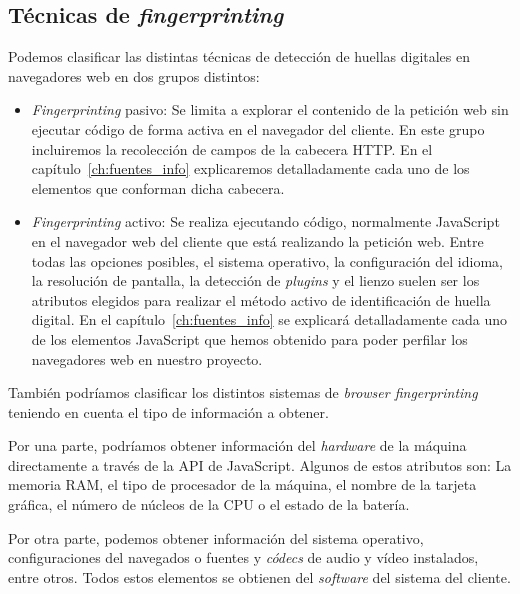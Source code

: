 \subsection{Técnicas de \textit{fingerprinting}}

Podemos clasificar las distintas técnicas de detección de huellas digitales en navegadores web en dos grupos distintos: \par 

\begin{itemize}
	\item \textit{Fingerprinting} pasivo: Se limita a explorar el contenido de la petición web sin ejecutar código de forma activa en el navegador del cliente. En este grupo incluiremos la recolección de campos de la cabecera HTTP. En el capítulo~\ref{ch:fuentes_info} explicaremos detalladamente cada uno de los elementos que conforman dicha cabecera. \par 
	
	\item \textit{Fingerprinting} activo:  Se realiza ejecutando código, normalmente JavaScript en el navegador web del cliente que está realizando la petición web. Entre todas las opciones posibles, el sistema operativo, la configuración del idioma, la resolución de pantalla, la detección de \textit{plugins} y el lienzo suelen ser los atributos elegidos para realizar el método activo de identificación de huella digital. En el capítulo~\ref{ch:fuentes_info} se explicará detalladamente cada uno de los elementos JavaScript que hemos obtenido para poder perfilar los navegadores web en nuestro proyecto. \par 
	
\end{itemize}

También podríamos clasificar los distintos sistemas de \textit{browser fingerprinting} teniendo en cuenta el tipo de información a obtener. \par 

Por una parte, podríamos obtener información del \textit{hardware} de la máquina directamente a través de la API de JavaScript. Algunos de estos atributos son: La memoria RAM, el tipo de procesador de la máquina, el nombre de la tarjeta gráfica, el número de núcleos de la CPU o el estado de la batería. \par

Por otra parte, podemos obtener información del sistema operativo, configuraciones del navegados o fuentes y \textit{códecs} de audio y vídeo instalados, entre otros. Todos estos elementos se obtienen del \textit{software} del sistema del cliente. \par 

